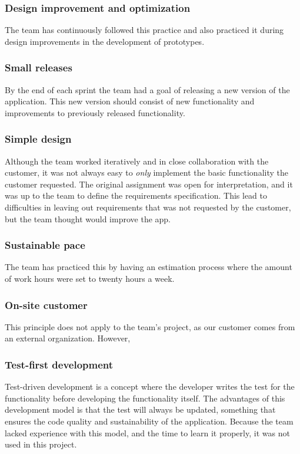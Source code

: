 \subsubsection{Design improvement and optimization}
The team has continuously followed this practice and also practiced it during design improvements in the development of prototypes.
 
\subsubsection{Small releases}
By the end of each sprint the team had a goal of releasing a new version of the application. This new version should consist of new functionality and improvements to previously released functionality.

\subsubsection{Simple design}
Although the team worked iteratively and in close collaboration with the customer, it was not always easy to \emph{only} implement the basic functionality the customer requested. The original assignment was open for interpretation, and it was up to the team to define the requirements specification. This lead to difficulties in leaving out requirements that was not requested by the customer, but the team thought would improve the app.

\subsubsection{Sustainable pace}
The team has practiced this by having an estimation process where the amount of work hours were set to twenty hours a week.

\subsubsection{On-site customer}
This principle does not apply to the team's project, as our customer comes from an external organization. However,

\subsubsection{Test-first development}
Test-driven development is a concept where the developer writes the test for the functionality before developing the functionality itself. The advantages of this development model is that the test will always be updated, something that ensures the code quality and sustainability of the application. Because the team lacked experience with this model, and the time to learn it properly, it was not used in this project.


